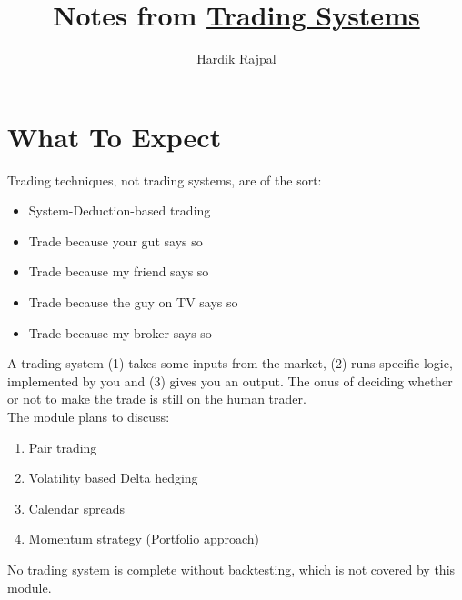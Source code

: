 \documentclass{article}
\author{Hardik Rajpal}
\title{Notes from \href{https://zerodha.com/varsity/chapter/what-to-expect/}{Trading Systems}}
\begin{document}
\maketitle
\section{What To Expect}
Trading techniques, not trading systems, are of the sort:
\begin{itemize}
    \item System-Deduction-based trading
    \item Trade because your gut says so
    \item Trade because my friend says so
    \item Trade because the guy on TV says so
    \item Trade because my broker says so
\end{itemize}
A trading system (1) takes some inputs from the market, (2) runs specific logic, implemented
by you and (3) gives you an output. The onus of deciding whether or not to make
the trade is still on the human trader.\\
The module plans to discuss:
\begin{enumerate}
    \item Pair trading
    \item Volatility based Delta hedging
    \item Calendar spreads
    \item Momentum strategy (Portfolio approach)
\end{enumerate}
No trading system is complete without backtesting, which is not covered by this module.
\end{document}
